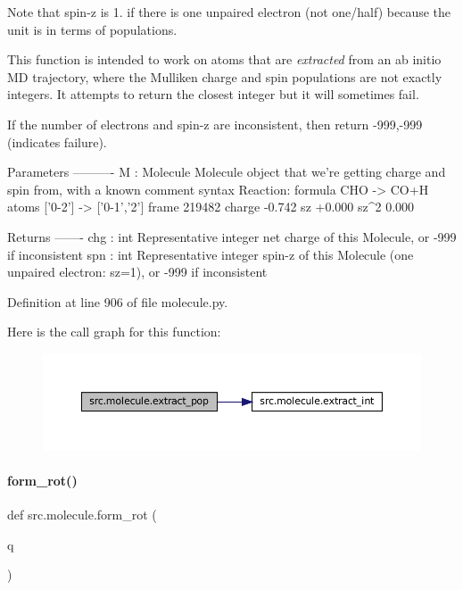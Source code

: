 Note that spin-\/z is 1. if there is one unpaired electron (not one/half) because the unit is in terms of populations.

This function is intended to work on atoms that are {\itshape extracted} from an ab initio MD trajectory, where the Mulliken charge and spin populations are not exactly integers. It attempts to return the closest integer but it will sometimes fail.

If the number of electrons and spin-\/z are inconsistent, then return -\/999,-\/999 (indicates failure).

\begin{DoxyVerb} Parameters
 ----------
 M : Molecule
     Molecule object that we're getting charge and spin from, with a known comment syntax
     Reaction: formula CHO -> CO+H atoms ['0-2'] -> ['0-1','2'] frame 219482 charge -0.742 sz +0.000 sz^2 0.000

 Returns
 -------
 chg : int
     Representative integer net charge of this Molecule, or -999 if inconsistent
 spn : int
     Representative integer spin-z of this Molecule (one unpaired electron: sz=1), or -999 if inconsistent\end{DoxyVerb}
 

Definition at line 906 of file molecule.\+py.

Here is the call graph for this function\+:
\nopagebreak
\begin{figure}[H]
\begin{center}
\leavevmode
\includegraphics[width=350pt]{namespacesrc_1_1molecule_a76b7defcd5b5e5db182fdf2f9f82f4ce_cgraph}
\end{center}
\end{figure}
\mbox{\label{namespacesrc_1_1molecule_a593b80c51a439f35789c16ad5fbcbfec}} 
\paragraph{\texorpdfstring{form\+\_\+rot()}{form\_rot()}}
{\footnotesize\ttfamily def src.\+molecule.\+form\+\_\+rot (\begin{DoxyParamCaption}\item[{}]{q }\end{DoxyParamCaption})}



